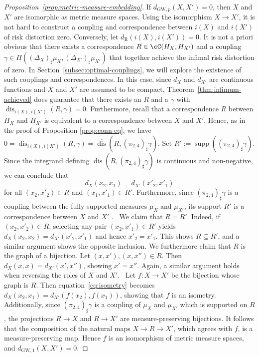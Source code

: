 \documentclass[twoside,11pt]{article}
\newcommand{\op}[1]{\operatorname{#1}}
\newcommand{\dexp}[1][]{d_{\mathrm{R}#1}}
\DeclareMathOperator{\dis}{dis}
\newcommand{\dGWp}[1]{d_{\mathrm{GW},#1}}
\begin{document}
\begin{proof}[Proposition~\ref{prop:metric-measure-embedding}]
    If $\dGWp{p}(X,X') = 0$, then $X$ and $X'$ are isomorphic as metric measure spaces. Using the isomorphism $X\to X'$, it is not hard to construct a coupling and correspondence between $i(X)$ and $i(X')$ of risk distortion zero. Conversely, let $\dexp(i(X),i(X')) = 0$. It is not a priori obvious that there exists a correspondence $R\in \cC(H_X,H_{X'})$ and a coupling $\gamma \in \Pi((\Delta_X)_\sharp \mu_X, (\Delta_{X'})_\sharp \mu_{X'})$ that together achieve the infimal risk distortion of zero. In Section~\ref{subsec:optimal-couplings}, we will explore the existence of such couplings and correspondences. In this case, since $d_X$ and $d_{X'}$ are continuous functions and $X$ and $X'$ are assumed to be compact, Theorem~\ref{thm:infimum-achieved} does guarantee that there exists an $R$ and a $\gamma$ with $\dis_{i(X),i(X')}(R,\gamma) = 0$. Furthermore, recall that a correspondence $R$ between $H_X$ and $H_{X'}$ is equivalent to a correspondence between $X$ and $X'$. Hence, as in the proof of Proposition \ref{prop:conn-eq}, we have $0 = \dis_{i(X),i(X')}(R,\gamma) = \overline{\dis}(R,(\pi_{2,4})_\sharp\gamma)$.      Set $R' := \op{supp}((\pi_{2,4})_\sharp\gamma)$. Since the integrand defining $\overline{\dis}(R,(\pi_{2,4})_\sharp\gamma)$ is continuous and non-negative, we can conclude that
    \begin{equation}
        d_X(x_2,x_1) = d_{X'}(x'_2,x'_1) \label{eq:isometry}
    \end{equation}
    for all $(x_2,x'_2) \in R$ and $(x_1,x'_1)\in R'$. Furthermore, since $(\pi_{2,4})_\sharp\gamma$ is a coupling between the fully supported measures $\mu_X$ and $\mu_{X'}$, its support $R'$ is a correspondence between $X$ and $X'$ \citep[see][Lemma 2.2]{memoli_gromovwasserstein_2011}.
\
    We claim that $R = R'$. Indeed, if $(x_2,x'_2) \in R$, selecting any pair $(x_2,x'_1) \in R'$ yields $d_X(x_2,x_2) = d_{X'}(x'_2,x'_1)$ and hence $x'_2 = x'_1$. This shows $R\subseteq R'$, and a similar argument shows the opposite inclusion. We furthermore claim that $R$ is the graph of a bijection. Let $(x,x'), (x,x'') \in R$. Then $d_X(x,x) = d_{X'}(x',x'')$, showing $x' = x''$. Again, a similar argument holds when reversing the roles of $X$ and $X'$.
    \
    Let $f:X\to X'$ be the bijection whose graph is $R$. Then equation~\eqref{eq:isometry} becomes $d_X(x_2,x_1) = d_{X'}(f(x_2),f(x_1))$, showing that $f$ is an isometry. Additionally, since $(\pi_{2,4})_\sharp\gamma$ is a coupling of $\mu_X$ and $\mu_{X'}$ which is supported on $R$, the projections $R\to X$ and $R\to X'$ are measure-preserving bijections. It follows that the composition of the natural maps $X\to R \to X'$, which agrees with $f$, is a measure-preserving map. Hence $f$ is an isomorphism of metric measure spaces, and $\dGWp{1}(X,X') = 0$.
\end{proof}
\end{document}
